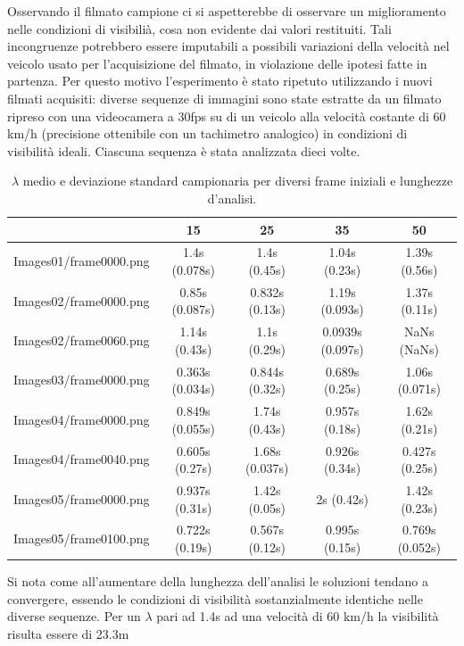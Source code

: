 \documentclass[12pt]{report}
\begin{document}
\noindent Osservando il filmato campione ci si aspetterebbe di osservare un miglioramento nelle condizioni di visibili\`a, cosa non evidente dai valori restituiti. Tali incongruenze potrebbero essere imputabili a possibili variazioni della velocit\`a nel veicolo usato per l'acquisizione del filmato, in violazione delle ipotesi fatte in partenza. Per questo motivo l'esperimento \`e stato ripetuto utilizzando i nuovi filmati acquisiti: diverse sequenze di immagini sono state estratte da un filmato ripreso con una videocamera a 30fps su di un veicolo alla velocit\`a costante di 60 km/h (precisione ottenibile con un tachimetro analogico) in condizioni di visibilit\`a ideali. Ciascuna sequenza \`e stata analizzata dieci volte.\\

\begin{table}[H]
\centering
\begin{tabular}{|c|c|c|c|c|}
	\hline
	& 15 & 25 & 35 & 50 \\ \hline
	Images01/frame0000.png & 1.4s (0.078s) & 1.4s (0.45s) & 1.04s (0.23s) & 1.39s (0.56s)\\ \hline
	Images02/frame0000.png & 0.85s (0.087s) & 0.832s (0.13s) & 1.19s (0.093s) & 1.37s (0.11s)\\ \hline
	Images02/frame0060.png & 1.14s (0.43s) & 1.1s (0.29s) & 0.0939s (0.097s) & NaNs (NaNs)\\ \hline
	Images03/frame0000.png & 0.363s (0.034s) & 0.844s (0.32s) & 0.689s (0.25s) & 1.06s (0.071s)\\ \hline
	Images04/frame0000.png & 0.849s (0.055s) & 1.74s (0.43s) & 0.957s (0.18s) & 1.62s (0.21s)\\ \hline
	Images04/frame0040.png & 0.605s (0.27s) & 1.68s (0.037s) & 0.926s (0.34s) & 0.427s (0.25s)\\ \hline
	Images05/frame0000.png & 0.937s (0.31s) & 1.42s (0.05s) & 2s (0.42s) & 1.42s (0.23s)\\ \hline
	Images05/frame0100.png & 0.722s (0.19s) & 0.567s (0.12s) & 0.995s (0.15s) & 0.769s (0.052s)\\ \hline
\end{tabular}
\caption{$\lambda$ medio e deviazione standard campionaria per diversi frame iniziali e lunghezze d'analisi.}
\end{table}

\noindent Si nota come all'aumentare della lunghezza dell'analisi le soluzioni tendano a convergere, essendo le condizioni di visibilit\`a sostanzialmente identiche nelle diverse sequenze. Per un $\lambda$ pari ad 1.4s ad una velocit\`a di 60 km/h la visibilit\`a risulta essere di 23.3m\\
\end{document}
